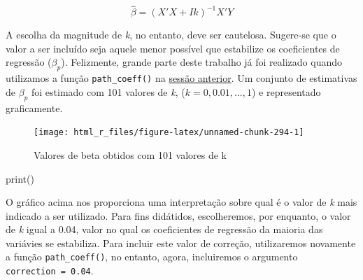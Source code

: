 \documentclass[
]{book}
\newenvironment{Shaded}{\begin{snugshade}}{\end{snugshade}}
\newcommand{\DataTypeTok}[1]{\textcolor[rgb]{0.13,0.29,0.53}{#1}}
\newcommand{\FloatTok}[1]{\textcolor[rgb]{0.00,0.00,0.81}{#1}}
\newcommand{\KeywordTok}[1]{\textcolor[rgb]{0.13,0.29,0.53}{\textbf{#1}}}
\newcommand{\NormalTok}[1]{#1}
\newcommand{\OperatorTok}[1]{\textcolor[rgb]{0.81,0.36,0.00}{\textbf{#1}}}
\newcommand{\OtherTok}[1]{\textcolor[rgb]{0.56,0.35,0.01}{#1}}
\newcommand{\StringTok}[1]{\textcolor[rgb]{0.31,0.60,0.02}{#1}}
\begin{document}
\[
\hat \beta = (X'X+Ik)^{-1} X'Y
\]

A escolha da magnitude de \emph{k}, no entanto, deve ser cautelosa. Sugere-se que o valor a ser incluído seja aquele menor possível que estabilize os coeficientes de regressão (\(\beta_p\)). Felizmente, grande parte deste trabalho já foi realizado quando utilizamos a função \texttt{path\_coeff()}  na \protect\hyperlink{analise-tradicional}{sessão anterior}. Um conjunto de estimativas de \(\beta_p\) foi estimado com 101 valores de \emph{k}, (\(k = 0, 0.01, ..., 1\)) e representado graficamente.

\begin{Shaded}
\end{Shaded}

\begin{figure}

{\centering \texttt{[image: html\_r\_files/figure-latex/unnamed-chunk-294-1]} 

}

\caption{Valores de beta obtidos com 101 valores de k}\label{fig:unnamed-chunk-294}
\end{figure}

print()

O gráfico acima nos proporciona uma interpretação sobre qual é o valor de \emph{k} mais indicado a ser utilizado. Para fins didátidos, escolheremos, por enquanto, o valor de \emph{k} igual a 0.04, valor no qual os coeficientes de regressão da maioria das variávies se estabiliza. Para incluir este valor de correção, utilizaremos novamente a função \texttt{path\_coeff()}, no entanto, agora, incluiremos o argumento \texttt{correction\ =\ 0.04}.

\begin{Shaded}
\end{Shaded}
\end{document}
